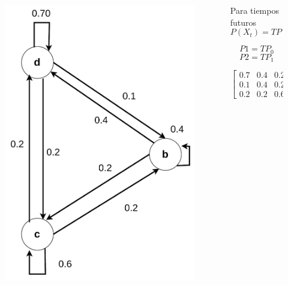 \documentclass[11pt]{beamer}
\begin{document}
\begin{frame}\small
	\begin{columns}
		\begin{column}{0.5\textwidth}
			\vspace{-0.5cm}
			\begin{figure}
				\includegraphics[scale=0.5]{images/markov_cuatro.pdf}
			\end{figure}
		\end{column}
		\begin{column}{0.5\textwidth}
			Para tiempos futuros
			\[P(X_t) = TP(X_{t-1})\equiv P_t\]
			
			\[P1 = TP_0\]
			\[P2 = TP_1\]
			
			\[\begin{bmatrix}
			0.7 & 0.4 & 0.2\\
			0.1 & 0.4 & 0.2\\
			0.2 & 0.2 & 0.6
			\end{bmatrix} \begin{bmatrix}
						0.7 \\
						0.2 \\
						0.1
					  \end{bmatrix}\]
					  

\end{column}
\end{columns}
\end{frame}
\end{document}

